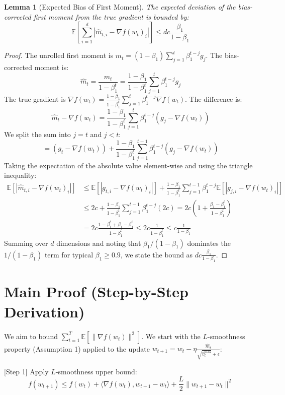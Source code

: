 \documentclass{article}
\newtheorem{lemma}[theorem]{Lemma}
\begin{document}
\begin{lemma}[Expected Bias of First Moment]
The expected deviation of the bias-corrected first moment from the true gradient is bounded by:
$$ \mathbb{E}\left[ \sum_{i=1}^d |\hat{m}_{t,i} - \nabla f(w_t)_i| \right] \leq d c \frac{\beta_1}{1-\beta_1} $$
\end{lemma}
\begin{proof}
The unrolled first moment is $m_t = (1-\beta_1) \sum_{j=1}^t \beta_1^{t-j} g_j$. The bias-corrected moment is:
$$ \hat{m}_t = \frac{m_t}{1-\beta_1^t} = \frac{1-\beta_1}{1-\beta_1^t} \sum_{j=1}^t \beta_1^{t-j} g_j $$
The true gradient is $\nabla f(w_t) = \frac{1-\beta_1}{1-\beta_1^t} \sum_{j=1}^t \beta_1^{t-j} \nabla f(w_t)$. The difference is:
$$ \hat{m}_t - \nabla f(w_t) = \frac{1-\beta_1}{1-\beta_1^t} \sum_{j=1}^t \beta_1^{t-j} (g_j - \nabla f(w_t)) $$
We split the sum into $j=t$ and $j < t$:
$$ = (g_t - \nabla f(w_t)) + \frac{1-\beta_1}{1-\beta_1^t} \sum_{j=1}^{t-1} \beta_1^{t-j} (g_j - \nabla f(w_t)) $$
Taking the expectation of the absolute value element-wise and using the triangle inequality:
\begin{align*}
\mathbb{E}[|\hat{m}_{t,i} - \nabla f(w_t)_i|] &\leq \mathbb{E}[|g_{t,i} - \nabla f(w_t)_i|] + \frac{1-\beta_1}{1-\beta_1^t} \sum_{j=1}^{t-1} \beta_1^{t-j} \mathbb{E}[|g_{j,i} - \nabla f(w_t)_i|] \\
&\leq 2c + \frac{1-\beta_1}{1-\beta_1^t} \sum_{j=1}^{t-1} \beta_1^{t-j} (2c) = 2c \left( 1 + \frac{\beta_1 - \beta_1^t}{1-\beta_1^t} \right) \\
&= 2c \frac{1-\beta_1^t + \beta_1 - \beta_1^t}{1-\beta_1^t} \leq 2c \frac{1}{1-\beta_1^t} \leq c \frac{1}{1-\beta_1}
\end{align*}
Summing over $d$ dimensions and noting that $\beta_1 / (1-\beta_1)$ dominates the $1/(1-\beta_1)$ term for typical $\beta_1 \geq 0.9$, we state the bound as $d c \frac{\beta_1}{1-\beta_1}$.
\end{proof}

\section*{Main Proof (Step-by-Step Derivation)}

We aim to bound $\sum_{t=1}^T \mathbb{E}[\|\nabla f(w_t)\|^2]$. We start with the $L$-smoothness property (Assumption 1) applied to the update $w_{t+1} = w_t - \eta \frac{\hat{m}_t}{\sqrt{\hat{v}_t^{\max}} + \epsilon}$:

[Step 1] Apply $L$-smoothness upper bound:
$$ f(w_{t+1}) \leq f(w_t) + \langle \nabla f(w_t), w_{t+1} - w_t \rangle + \frac{L}{2} \|w_{t+1} - w_t\|^2 $$
\end{document}

